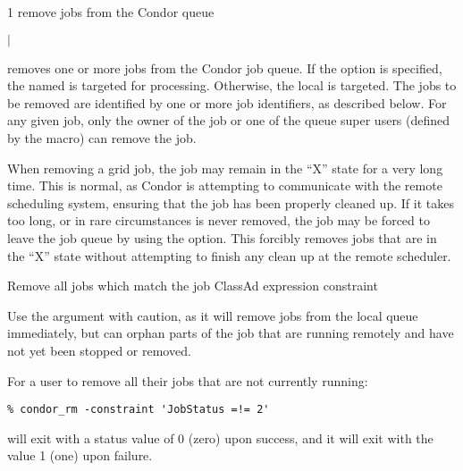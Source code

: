 \begin{ManPage}{\label{man-condor-rm}}{1}
{remove jobs from the Condor queue}
\Synopsis {}
\ToolArgsBase

\ToolDebugOption
{}
\ToolLocate
\ToolJobs
$|$  \Dots

\ToolDebugOption
\ToolLocate
\ToolAll


\Description

 removes one or more jobs from the Condor job queue.  
If the  option is specified, the named  is targeted
for processing.  
Otherwise, the local  is targeted.
The jobs to be removed are identified by one or more job identifiers, as
described below.
For any given job, only the owner of the job or one of the queue super users
(defined by the  macro) can remove the job.

When removing a grid job, the job may remain in
the ``X'' state for a very long time. 
This is normal, as Condor is attempting to communicate with the
remote scheduling system, 
ensuring that the job has been properly cleaned up.
If it takes too long, or in rare circumstances is never removed,
the job may be forced to
leave the job queue by using the  option.
This forcibly removes jobs that are in the ``X'' state without attempting
to finish any clean up at the remote scheduler.

\begin{Options}
	\ToolArgsBaseDesc
	\ToolLocateDesc
        \ToolDebugDesc
	 {Remove all jobs which match
	                the job ClassAd expression constraint}
\end{Options}

\GenRem

Use the  argument with caution, as it will remove jobs
from the local queue immediately, but can orphan parts of the job
that are running remotely and have not yet been stopped or removed.

\Examples
For a user to remove all their jobs that are not currently running:
\footnotesize
\begin{verbatim}
% condor_rm -constraint 'JobStatus =!= 2'
\end{verbatim}
\normalsize

\ExitStatus

 will exit with a status value of 0 (zero) upon success,
and it will exit with the value 1 (one) upon failure.

\end{ManPage}
